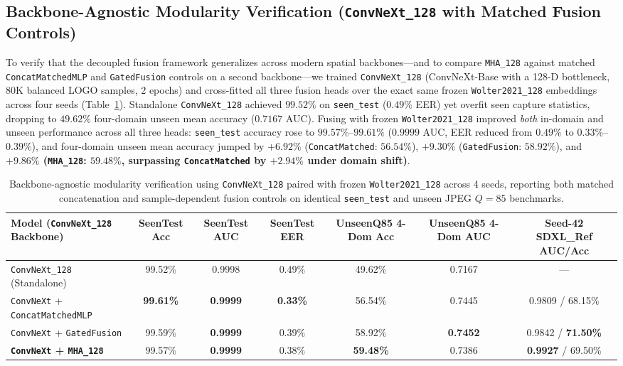 \documentclass[fleqn,10pt]{wlscirep}
\begin{document}
\subsection*{Backbone-Agnostic Modularity Verification (\texttt{ConvNeXt\_128} with Matched Fusion Controls)}
To verify that the decoupled fusion framework generalizes across modern spatial backbones---and to compare \texttt{MHA\_128} against matched \texttt{ConcatMatchedMLP} and \texttt{GatedFusion} controls on a second backbone---we trained \texttt{ConvNeXt\_128} (ConvNeXt-Base with a 128-D bottleneck, 80K balanced LOGO samples, 2 epochs) and cross-fitted all three fusion heads over the exact same frozen \texttt{Wolter2021\_128} embeddings across four seeds (Table~\ref{tab:convnext}). Standalone \texttt{ConvNeXt\_128} achieved $99.52\%$ on \texttt{seen\_test} ($0.49\%$ EER) yet overfit seen capture statistics, dropping to $49.62\%$ four-domain unseen mean accuracy ($0.7167$ AUC). Fusing with frozen \texttt{Wolter2021\_128} improved \emph{both} in-domain and unseen performance across all three heads: \texttt{seen\_test} accuracy rose to $99.57\%$--$99.61\%$ ($0.9999$ AUC, EER reduced from $0.49\%$ to $0.33\%$--$0.39\%$), and four-domain unseen mean accuracy jumped by $+6.92\%$ (\texttt{ConcatMatched}: $56.54\%$), $+9.30\%$ (\texttt{GatedFusion}: $58.92\%$), and \textbf{$+9.86\%$ (\texttt{MHA\_128}: $59.48\%$, surpassing \texttt{ConcatMatched} by $+2.94\%$ under domain shift)}.

\begin{table}[tbp]
\centering
\caption{Backbone-agnostic modularity verification using \texttt{ConvNeXt\_128} paired with frozen \texttt{Wolter2021\_128} across 4 seeds, reporting both matched concatenation and sample-dependent fusion controls on identical \texttt{seen\_test} and unseen JPEG $Q=85$ benchmarks.}
\label{tab:convnext}
\scriptsize
\begin{tabular}{@{}lcccccc@{}}
\toprule
\textbf{Model (\texttt{ConvNeXt\_128} Backbone)} & \textbf{SeenTest Acc} & \textbf{SeenTest AUC} & \textbf{SeenTest EER} & \textbf{UnseenQ85 4-Dom Acc} & \textbf{UnseenQ85 4-Dom AUC} & \textbf{Seed-42 SDXL\_Ref AUC/Acc} \\
\midrule
\texttt{ConvNeXt\_128} (Standalone) & 99.52\% & 0.9998 & 0.49\% & 49.62\% & 0.7167 & --- \\
\texttt{ConvNeXt} + \texttt{ConcatMatchedMLP} & \textbf{99.61\%} & \textbf{0.9999} & \textbf{0.33\%} & 56.54\% & 0.7445 & 0.9809 / 68.15\% \\
\texttt{ConvNeXt} + \texttt{GatedFusion} & 99.59\% & \textbf{0.9999} & 0.39\% & 58.92\% & \textbf{0.7452} & 0.9842 / \textbf{71.50\%} \\
\textbf{\texttt{ConvNeXt} + \texttt{MHA\_128}} & 99.57\% & \textbf{0.9999} & 0.38\% & \textbf{59.48\%} & 0.7386 & \textbf{0.9927} / 69.50\% \\
\bottomrule
\end{tabular}
\end{table}
\end{document}
